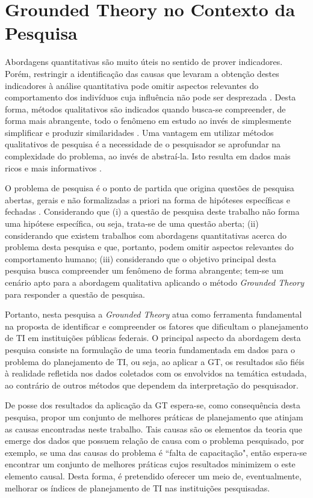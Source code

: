 \section{Grounded Theory no Contexto da Pesquisa}
Abordagens quantitativas são muito úteis no sentido de prover indicadores. Porém, restringir a identificação das causas que levaram a obtenção destes indicadores à análise quantitativa pode omitir aspectos relevantes do comportamento dos indivíduos cuja influência não pode ser desprezada \cite{conte:09}. Desta forma, métodos qualitativos são indicados quando busca-se compreender, de forma mais abrangente, todo o fenômeno em estudo ao invés de simplesmente simplificar e produzir similaridades \cite{seaman:99}. Uma vantagem em utilizar métodos qualitativos de pesquisa é a necessidade de o pesquisador se aprofundar na complexidade do problema, ao invés de abstraí-la. Isto resulta em dados mais ricos e mais informativos \cite{seaman:08}.

O problema de pesquisa é o ponto de partida que origina questões de pesquisa abertas, gerais e não formalizadas a priori na forma de hipóteses específicas e fechadas \cite{bandeira:03}. Considerando que (i) a questão de pesquisa deste trabalho não forma uma hipótese específica, ou seja, trata-se de uma questão aberta; (ii) considerando que existem trabalhos com abordagens quantitativas acerca do problema desta pesquisa e que, portanto, podem omitir aspectos relevantes do comportamento humano; (iii) considerando que o objetivo principal desta pesquisa busca compreender um fenômeno de forma abrangente; tem-se um cenário apto para a abordagem qualitativa aplicando o método \textit{Grounded Theory} para responder a questão de pesquisa. 

Portanto, nesta pesquisa a \textit{Grounded Theory} atua como ferramenta fundamental na proposta de identificar e compreender os fatores que dificultam o planejamento de TI em instituições públicas federais. O principal aspecto da abordagem desta pesquisa consiste na formulação de uma teoria fundamentada em dados para o problema do planejamento de TI, ou seja, ao aplicar a GT, os resultados são fiéis à realidade refletida nos dados coletados com os envolvidos na temática estudada, ao contrário de outros métodos que dependem da interpretação do pesquisador. 

De posse dos resultados da aplicação da GT espera-se, como consequência desta pesquisa, propor um conjunto de melhores práticas de planejamento que atinjam as causas encontradas neste trabalho. Tais causas são os elementos da teoria que emerge dos dados que possuem relação de causa com o problema pesquisado, por exemplo, se uma das causas do problema é ``falta de capacitação", então espera-se encontrar um conjunto de melhores práticas cujos resultados minimizem o este elemento causal. Desta forma, é pretendido oferecer um meio de, eventualmente, melhorar os índices de planejamento de TI nas instituições pesquisadas. 

